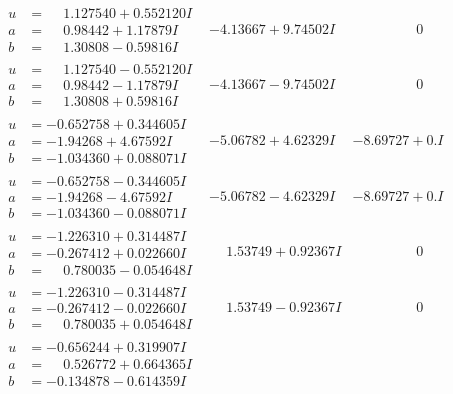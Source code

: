 \documentclass[1p]{elsarticle_modified}
\theoremstyle{definition}
\begin{document}
$$\begin{array}{c|c|c}
\begin{aligned}
u &= \phantom{-}1.127540 + 0.552120 I \\
a &= \phantom{-}0.98442 + 1.17879 I \\
b &= \phantom{-}1.30808 - 0.59816 I\end{aligned}
 & -4.13667 + 9.74502 I & \phantom{-0.000000 } 0 \\ \hline\begin{aligned}
u &= \phantom{-}1.127540 - 0.552120 I \\
a &= \phantom{-}0.98442 - 1.17879 I \\
b &= \phantom{-}1.30808 + 0.59816 I\end{aligned}
 & -4.13667 - 9.74502 I & \phantom{-0.000000 } 0 \\ \hline\begin{aligned}
u &= -0.652758 + 0.344605 I \\
a &= -1.94268 + 4.67592 I \\
b &= -1.034360 + 0.088071 I\end{aligned}
 & -5.06782 + 4.62329 I & -8.69727 + 0. I\phantom{ +0.000000I} \\ \hline\begin{aligned}
u &= -0.652758 - 0.344605 I \\
a &= -1.94268 - 4.67592 I \\
b &= -1.034360 - 0.088071 I\end{aligned}
 & -5.06782 - 4.62329 I & -8.69727 + 0. I\phantom{ +0.000000I} \\ \hline\begin{aligned}
u &= -1.226310 + 0.314487 I \\
a &= -0.267412 + 0.022660 I \\
b &= \phantom{-}0.780035 - 0.054648 I\end{aligned}
 & \phantom{-}1.53749 + 0.92367 I & \phantom{-0.000000 } 0 \\ \hline\begin{aligned}
u &= -1.226310 - 0.314487 I \\
a &= -0.267412 - 0.022660 I \\
b &= \phantom{-}0.780035 + 0.054648 I\end{aligned}
 & \phantom{-}1.53749 - 0.92367 I & \phantom{-0.000000 } 0 \\ \hline\begin{aligned}
u &= -0.656244 + 0.319907 I \\
a &= \phantom{-}0.526772 + 0.664365 I \\
b &= -0.134878 - 0.614359 I\end{aligned}

\end{array}$$
\end{document}
